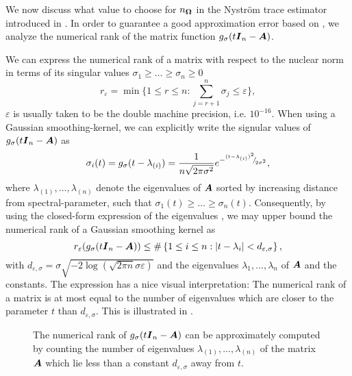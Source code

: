 \documentclass[12pt]{article}
\begin{document}
We now discuss what value to choose for $n_{\boldsymbol{\Omega}}$ in the Nyström trace estimator introduced in . In order to guarantee a good approximation error based on , we analyze the numerical rank of the matrix function $g_{\sigma}(t\boldsymbol{I}_n - \boldsymbol{A})$.

We can express the numerical rank of a matrix with respect to the nuclear norm in terms of its singular values $\sigma_1 \geq \dots \geq \sigma_n \geq 0$
\begin{equation}
    r_{\varepsilon} = \min \{1 \leq r \leq n: \sum_{j=r+1}^n \sigma_{j} \leq \varepsilon \},
    \label{equ:numerical-rank}
\end{equation}
$\varepsilon$ is usually taken to be the double machine precision, i.e. $10^{-16}$. When using a Gaussian smoothing-kernel, we can explicitly write the signular values of $g_{\sigma}(t\boldsymbol{I}_n - \boldsymbol{A})$ as
\begin{equation}
    \sigma_i(t) = g_{\sigma}(t - \lambda_{(i)}) = \frac{1}{n \sqrt{2 \pi \sigma^2}} e^{-{}^{(t - \lambda_{(i)})^2}{\mskip -5mu/\mskip -3mu}_{2 \sigma^2}},
    \label{equ:gaussian-kernel-eigenvalues}
\end{equation}
where $\lambda_{(1)}, \dots, \lambda_{(n)}$ denote the eigenvalues of $\boldsymbol{A}$ sorted by increasing distance from spectral-parameter, such that $\sigma_1(t) \geq \dots \geq \sigma_n(t)$. Consequently, by using the closed-form expression of the eigenvalues , we may upper bound the numerical rank of a Gaussian smoothing kernel as
\begin{equation}
    r_{\varepsilon}(g_{\sigma}(t\boldsymbol{I}_n - \boldsymbol{A})) \leq \#\left\{1\leq i\leq n: |t - \lambda_i| < d_{\varepsilon, \sigma} \right\},
    \label{equ:gaussian-kernel-numerical-rank}
\end{equation}
with $d_{\varepsilon, \sigma} = \sigma \sqrt{-2 \log(\sqrt{2 \pi n} \sigma \varepsilon)}$ and the eigenvalues $\lambda_1, \dots, \lambda_n$ of $\boldsymbol{A}$ and the constants. The expression  has a nice visual interpretation: The numerical rank of a matrix is at most equal to the number of eigenvalues which are closer to the parameter $t$ than $d_{\varepsilon, \sigma}$. This is illustrated in .
\begin{figure}[ht]
    \centering
    
    \caption{The numerical rank of $g_{\sigma}(t\boldsymbol{I}_n - \boldsymbol{A})$ can be
        approximately computed by counting the number of eigenvalues
        $\lambda_{(1)}, \dots, \lambda_{(n)}$ of the matrix $\boldsymbol{A}$ which lie less than
        a constant $d_{\varepsilon, \sigma}$ away from $t$.}
    \label{fig:numerical-rank}
\end{figure}
\end{document}
